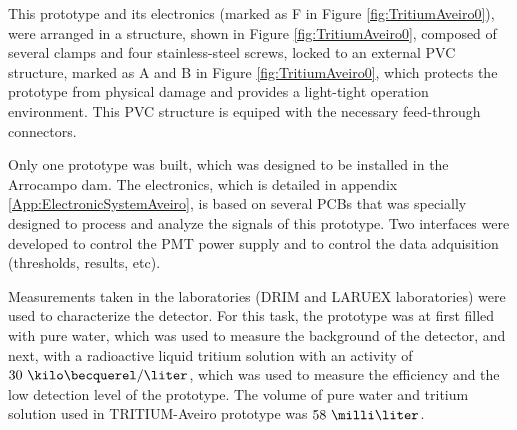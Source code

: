 This prototype and its electronics (marked as F in Figure \ref{fig:TritiumAveiro0}), were arranged in a structure, shown in Figure \ref{fig:TritiumAveiro0}, composed of several clamps and four stainless-steel screws, locked to an external PVC structure, marked as A and B in Figure \ref{fig:TritiumAveiro0}, which protects the prototype from physical damage and provides a light-tight operation environment. This PVC structure is equiped with the necessary feed-through connectors.

Only one prototype was built, which was designed to be installed in the Arrocampo dam. The electronics, which is detailed in appendix \ref{App:ElectronicSystemAveiro}, is based on several PCBs that was specially designed to process and analyze the signals of this prototype. Two interfaces were developed to control the PMT power supply and to control the data adquisition (thresholds, results, etc). 

Measurements taken in the laboratories (DRIM and LARUEX laboratories) were used to characterize the detector. For this task, the prototype was at first filled with pure water, which was used to measure the background of the detector, and next, with a radioactive liquid tritium solution with an activity of $30~\kilo\becquerel/\liter$, which was used to measure the efficiency and the low detection level of the prototype. The volume of pure water and tritium solution used in TRITIUM-Aveiro prototype was $58~\milli\liter$. 



